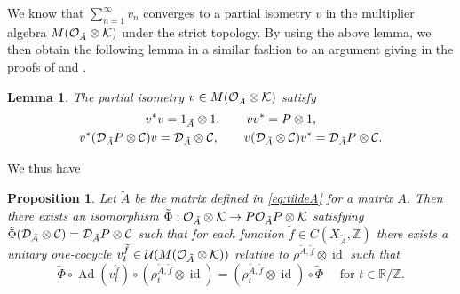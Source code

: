 \documentclass[11pt]{article}
\newtheorem{lemma}[theorem]{Lemma}
\newtheorem{proposition}[theorem]{Proposition}
\theoremstyle{plain}
\theoremstyle{definition}
\numberwithin{equation}{section}
\newcommand{\id}{\operatorname{id}}
\newcommand{\Ad}{\operatorname{Ad}}
\newcommand{\RZ}{\mathbb{R}/{\mathbb{Z}}}
\newcommand{\Z}{\mathbb{Z}}
\newcommand{\f}{\tilde{f}}
\begin{document}
We know that $\sum_{n=1}^\infty v_n$ converges to a partial isometry 
$v$ in the multiplier algebra $M({{\mathcal{O}}_{\tilde{A}}\otimes{\mathcal{K}}})$ under the strict topology. 
By using the above lemma,
we then obtain the following lemma in a similar fashion to an argument 
giving in the proofs of 
\cite[Lemma 2.5]{Brown}
and 
\cite[Proposition 4.1]{MaETDS2004}.
\begin{lemma}
The partial isometry
$v \in M({{\mathcal{O}}_{\tilde{A}}\otimes{\mathcal{K}}})$
satisfy  
\begin{gather*}
v^* v = 1_{\tilde{A}}\otimes 1, \qquad
v v^* = P \otimes 1, \\
v^*({\mathcal{D}}_{\tilde{A}} P\otimes{\mathcal{C}})v =
 {{\mathcal{D}}_{\tilde{A}}\otimes{\mathcal{C}}},
 \qquad
 v({{\mathcal{D}}_{\tilde{A}}\otimes{\mathcal{C}}})v^* = {\mathcal{D}}_{\tilde{A}} P\otimes{\mathcal{C}}.   
\end{gather*}
\end{lemma}
We thus have
\begin{proposition}\label{prop:Phit}
Let $\tilde{A}$ be the matrix defined in \eqref{eq:tildeA}
for a matrix $A$.
Then there exists an isomorphism
$\tilde{\Phi}:{{\mathcal{O}}_{\tilde{A}}\otimes{\mathcal{K}}} 
\rightarrow 
P{\mathcal{O}}_{\tilde{A}}P \otimes{\mathcal{K}}$ 
satisfying 
$\tilde{\Phi}({{\mathcal{D}}_{\tilde{A}}\otimes{\mathcal{C}}}) = 
{\mathcal{D}}_{\tilde{A}}P \otimes{\mathcal{C}}$
such that for each function
$\f\in C(X_{\tilde{A}},\Z)$
there exists a unitary one-cocycle
 $v_t^{\f} \in \U(M(\SOTA))$ relative to 
$\rho^{\tilde{A},\f} \otimes\id$
such that 
\begin{equation*}
\tilde{\Phi} \circ \Ad(v_t^{\f}) \circ (\rho^{\tilde{A},{\f}}_t\otimes \id)
 = (\rho^{\tilde{A},{\f}}_t\otimes\id) \circ \tilde{\Phi}
\quad
\text{ for }
 t \in \RZ.
\end{equation*}
\end{proposition}
\end{document}
